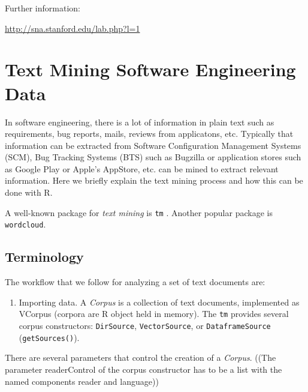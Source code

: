 \documentclass[
]{book}
\providecommand{\tightlist}{%
  \setlength{\itemsep}{0pt}\setlength{\parskip}{0pt}}
\begin{document}
Further information:

\url{http://sna.stanford.edu/lab.php?l=1}

\hypertarget{text-mining-software-engineering-data}{%
\chapter{Text Mining Software Engineering Data}\label{text-mining-software-engineering-data}}

In software engineering, there is a lot of information in plain text such as requirements, bug reports, mails, reviews from applicatons, etc. Typically that information can be extracted from Software Configuration Management Systems (SCM), Bug Tracking Systems (BTS) such as Bugzilla or application stores such as Google Play or Apple's AppStore, etc. can be mined to extract relevant information. Here we briefly explain the text mining process and how this can be done with R.

A well-known package for \emph{text mining} is \texttt{tm} \citep[\citet{FeinererHM08}]{FeinererH15}. Another popular package is \texttt{wordcloud}.

\hypertarget{terminology}{%
\section{Terminology}\label{terminology}}

The workflow that we follow for analyzing a set of text documents are:

\begin{enumerate}
\def\labelenumi{\arabic{enumi}.}
\tightlist
\item
  Importing data. A \emph{Corpus} is a collection of text documents, implemented as VCorpus (corpora are R object held in memory). The \texttt{tm} provides several corpus constructors: \texttt{DirSource}, \texttt{VectorSource}, or \texttt{DataframeSource} (\texttt{getSources()}).
\end{enumerate}

There are several parameters that control the creation of a \emph{Corpus}.
((The parameter readerControl of the corpus constructor has to be a list with the named components reader and language))
\end{document}
